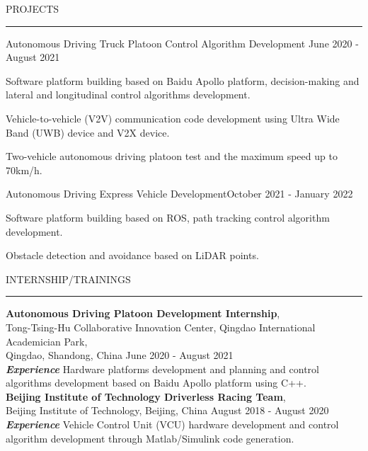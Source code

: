 \documentclass{resume} %
\renewenvironment{rSection}[1]{
\sectionskip
\textcolor{TsinghuaPurple}{\MakeUppercase{#1}}
\sectionlineskip
\hrule
\begin{list}{}{
\setlength{\leftmargin}{0em}
}
\item[]
}{
\end{list}
}
\begin{document}
\begin{rSection}{PROJECTS}

\begin{rSubsection}{Autonomous Driving Truck Platoon Control Algorithm Development} {June 2020 - August 2021}{}{}

\item Software platform building based on Baidu Apollo platform, decision-making and lateral and longitudinal control algorithms development.
\item Vehicle-to-vehicle (V2V) communication code development using Ultra Wide Band (UWB) device and V2X device.
\item Two-vehicle autonomous driving platoon test and the maximum speed up to 70km/h.
 
\end{rSubsection}  


\begin{rSubsection}{Autonomous Driving Express Vehicle Development}{October 2021 - January 2022}{}{} 
\item Software platform building based on ROS, path tracking control algorithm development.
\item Obstacle detection and avoidance based on LiDAR points.

\end{rSubsection}

\end{rSection} 



\begin{rSection}{INTERNSHIP/TRAININGS} \itemsep -3pt  

{\textbf{Autonomous Driving Platoon Development Internship}, \\ Tong-Tsing-Hu Collaborative Innovation Center, Qingdao International Academician Park,\\ Qingdao, Shandong, China}  \hfill  June 2020 - August 2021 \\
\textbf{\textit{Experience}}
Hardware platforms development and planning and control algorithms development based on Baidu Apollo platform using C++.
\\
{\textbf{Beijing Institute of Technology Driverless Racing Team}, 
\\Beijing Institute of Technology, Beijing, China} \hfill August 2018 - August 2020 \\     
\textbf{\textit{Experience}} Vehicle Control Unit (VCU) hardware development and control algorithm development through Matlab/Simulink code generation.

\end{rSection}  
 
\end{document}
